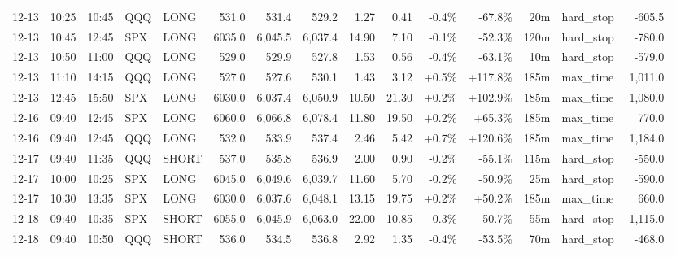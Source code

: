 \documentclass[11pt,a4paper,twoside]{article}
\begin{document}
\begin{landscape}
\begin{center}
\begin{longtable}{>{\color{txtmain}}l l l l l r r r r r r r r >{\color{txtmain}}l r}
12-13 & 10:25 & 10:45 & QQQ & LONG & 531.0 & 531.4 & 529.2 & 1.27 & 0.41 & \textcolor{lossred}{-0.4\%} & \textcolor{lossred}{-67.8\%} & 20m & hard\_stop & \textcolor{lossred}{-605.5} \\
12-13 & 10:45 & 12:45 & SPX & LONG & 6035.0 & 6,045.5 & 6,037.4 & 14.90 & 7.10 & \textcolor{lossred}{-0.1\%} & \textcolor{lossred}{-52.3\%} & 120m & hard\_stop & \textcolor{lossred}{-780.0} \\
12-13 & 10:50 & 11:00 & QQQ & LONG & 529.0 & 529.9 & 527.8 & 1.53 & 0.56 & \textcolor{lossred}{-0.4\%} & \textcolor{lossred}{-63.1\%} & 10m & hard\_stop & \textcolor{lossred}{-579.0} \\
12-13 & 11:10 & 14:15 & QQQ & LONG & 527.0 & 527.6 & 530.1 & 1.43 & 3.12 & \textcolor{wingreen}{+0.5\%} & \textcolor{wingreen}{+117.8\%} & 185m & max\_time & \textcolor{wingreen}{1,011.0} \\
12-13 & 12:45 & 15:50 & SPX & LONG & 6030.0 & 6,037.4 & 6,050.9 & 10.50 & 21.30 & \textcolor{wingreen}{+0.2\%} & \textcolor{wingreen}{+102.9\%} & 185m & max\_time & \textcolor{wingreen}{1,080.0} \\
12-16 & 09:40 & 12:45 & SPX & LONG & 6060.0 & 6,066.8 & 6,078.4 & 11.80 & 19.50 & \textcolor{wingreen}{+0.2\%} & \textcolor{wingreen}{+65.3\%} & 185m & max\_time & \textcolor{wingreen}{770.0} \\
12-16 & 09:40 & 12:45 & QQQ & LONG & 532.0 & 533.9 & 537.4 & 2.46 & 5.42 & \textcolor{wingreen}{+0.7\%} & \textcolor{wingreen}{+120.6\%} & 185m & max\_time & \textcolor{wingreen}{1,184.0} \\
12-17 & 09:40 & 11:35 & QQQ & SHORT & 537.0 & 535.8 & 536.9 & 2.00 & 0.90 & \textcolor{lossred}{-0.2\%} & \textcolor{lossred}{-55.1\%} & 115m & hard\_stop & \textcolor{lossred}{-550.0} \\
12-17 & 10:00 & 10:25 & SPX & LONG & 6045.0 & 6,049.6 & 6,039.7 & 11.60 & 5.70 & \textcolor{lossred}{-0.2\%} & \textcolor{lossred}{-50.9\%} & 25m & hard\_stop & \textcolor{lossred}{-590.0} \\
12-17 & 10:30 & 13:35 & SPX & LONG & 6030.0 & 6,037.6 & 6,048.1 & 13.15 & 19.75 & \textcolor{wingreen}{+0.2\%} & \textcolor{wingreen}{+50.2\%} & 185m & max\_time & \textcolor{wingreen}{660.0} \\
12-18 & 09:40 & 10:35 & SPX & SHORT & 6055.0 & 6,045.9 & 6,063.0 & 22.00 & 10.85 & \textcolor{lossred}{-0.3\%} & \textcolor{lossred}{-50.7\%} & 55m & hard\_stop & \textcolor{lossred}{-1,115.0} \\
12-18 & 09:40 & 10:50 & QQQ & SHORT & 536.0 & 534.5 & 536.8 & 2.92 & 1.35 & \textcolor{lossred}{-0.4\%} & \textcolor{lossred}{-53.5\%} & 70m & hard\_stop & \textcolor{lossred}{-468.0} \\

\end{longtable}
\end{center}
\end{landscape}
\end{document}
